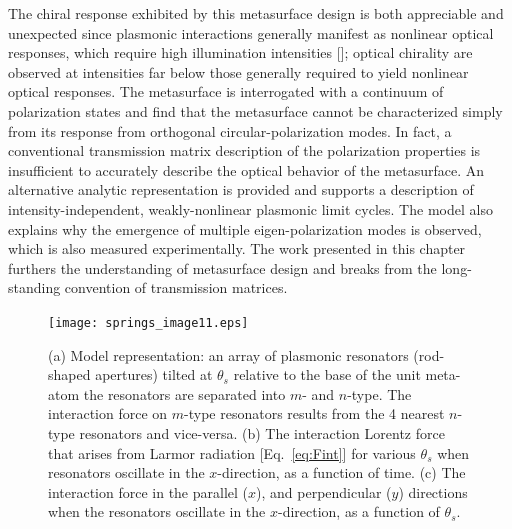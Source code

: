 The chiral response exhibited by this metasurface design is both appreciable and unexpected since plasmonic interactions generally manifest as nonlinear optical responses, which require high illumination intensities [\cite{Metzger2, Kauranen}]; optical chirality are observed at intensities far below those generally required to yield nonlinear optical responses. The metasurface is interrogated with a continuum of polarization states and find that the metasurface cannot be characterized simply from its response from orthogonal circular-polarization modes.  In fact, a conventional transmission matrix description of the polarization properties is insufficient to accurately describe the optical behavior of the metasurface.  An alternative analytic representation is provided and supports a description of intensity-independent, weakly-nonlinear plasmonic limit cycles.  The model also explains why the emergence of multiple eigen-polarization modes is observed, which is also measured experimentally. The work presented in this chapter furthers the understanding of metasurface design and breaks from the long-standing convention of transmission matrices.

\begin{figure}[b!]
\centering
\texttt{[image: springs\_image11.eps]}
\caption{(a) Model representation: an array of plasmonic resonators (rod-shaped apertures) tilted at $\theta_s$ relative to the base of the unit meta-atom the resonators are separated into $m$- and $n$-type. The interaction force on $m$-type resonators results from the 4 nearest $n$-type resonators and vice-versa. (b) The interaction Lorentz force that arises from Larmor radiation [Eq.~\ref{eq:Fint}] for various $\theta_s$ when resonators oscillate in the $x$-direction, as a function of time. (c) The interaction force in the parallel ($x$), and perpendicular ($y$) directions when the resonators oscillate in the $x$-direction, as a function of $\theta_s$.}
\label{fig:model}
\end{figure}
 

